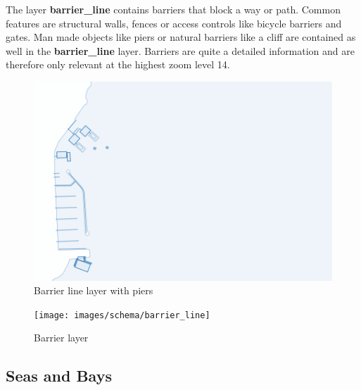 \noindent\begin{minipage}[t]{0.48\linewidth}
    \vspace{0pt}
    The layer \textbf{barrier\_line} contains barriers that block a way or path. Common features are structural walls, fences or access controls like bicycle barriers and gates. Man made objects like piers or natural barriers like a cliff are contained as well in the \textbf{barrier\_line} layer. Barriers are quite a detailed information and are therefore only relevant at the highest zoom level 14.
\end{minipage}
\hfill
\begin{minipage}[t]{0.48\linewidth}
    \begin{figure}[H]
      \includegraphics[width=1\textwidth]{images/schema/piers_example}
      \caption{Barrier line layer with piers}
    \end{figure}
\end{minipage}

\begin{figure}[H]
  \centering
  \texttt{[image: images/schema/barrier\_line]}
  \caption{Barrier layer}
\end{figure}

\subsection{Seas and Bays}

